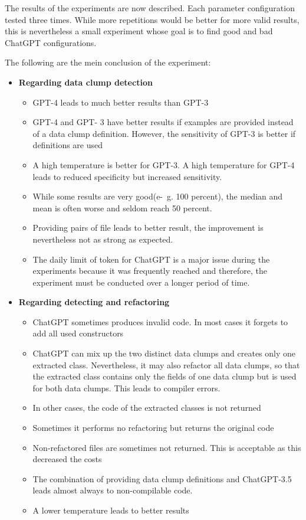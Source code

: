 The results of the experiments are now described. Each parameter configuration tested three times. While more repetitions would be better for more valid results, this is nevertheless a small experiment whose goal is to find good and bad ChatGPT configurations. 

The following are the mein conclusion of the experiment:
\begin{itemize}
\item \textbf{Regarding data clump detection}
\begin{itemize}
    \item GPT-4 leads to much better results than GPT-3
    \item GPT-4 and GPT-
    3 have better results if examples are provided instead of a data clump definition. However, the sensitivity of GPT-3 is better if definitions are used
    \item A high temperature is better for GPT-3. A high temperature for GPT-4 leads to reduced specificity but increased sensitivity. 
    \item While some results are very good(e-~g. 100 percent), the median and mean is often worse and seldom reach 50 percent. 
    \item Providing pairs of file leads to better result, the improvement is nevertheless not as strong as expected. 
    \item The daily limit of token for ChatGPT is a major issue during the experiments because it was frequently reached and therefore, the experiment  must be conducted over a longer period of time. 
\end{itemize}
  \item \textbf{Regarding detecting and refactoring} \begin{itemize}
       \item ChatGPT sometimes produces invalid code. In most cases it forgets to add all used constructors
    \item ChatGPT can mix up the two distinct data clumps and creates only one extracted class. Nevertheless, it may also refactor all data clumps, so that the extracted class contains only the fields of one data clump but is used for both data clumps. This leads to compiler errors.
       \item In other cases, the code of the extracted classes is not returned
       \item Sometimes it performs no refactoring but returns the original code
       \item Non-refactored files are sometimes not returned. This is acceptable as this decreased the costs
       \item The combination of providing data clump definitions and ChatGPT-3.5 leads almost always to non-compilable code.
       \item A lower temperature leads to better results
 
   \end{itemize}
\end{itemize}

